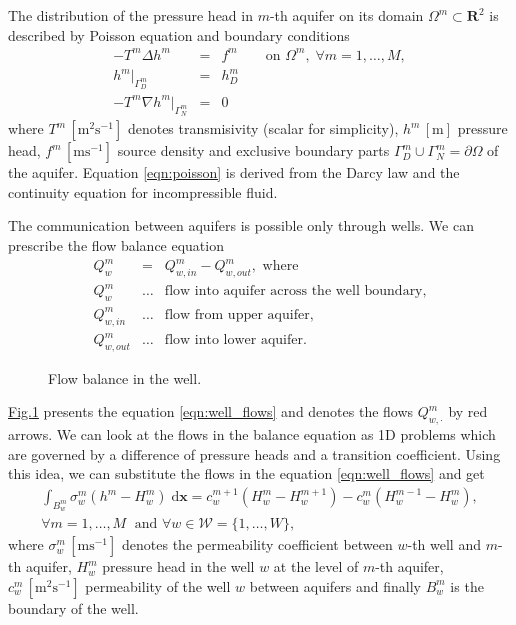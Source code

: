 \documentclass[preprint,12pt,authoryear]{elsarticle}
\newcommand{\fig}[1]{\hyperref[#1]{Fig.\ref{#1}}}
\newcommand{\figpath}{../graphics/}
\newcommand{\dd}{\; \mathrm{d}}
\newcommand{\R}{\mathbf{R}}
\newcommand{\bx}{\mathbf{x}}
\begin{document}
The distribution of the pressure head in $m$-th aquifer on its domain $\Omega^m\subset\R^2$ is described by 
Poisson equation and boundary conditions
\begin{eqnarray} \label{eqn:poisson}
-T^m\Delta{}h^m &=& f^m \qquad \textrm{on } \Omega^m,\; \forall m=1,\dots,M, \\
h^m|_{\Gamma^m_D} &=& h^m_D \\
-T^m\nabla h^m|_{\Gamma^m_N} &=& 0
\end{eqnarray}
where $T^m\, [\textrm{m}^2\textrm{s}^{-1}]$ denotes transmisivity (scalar for simplicity), 
$h^m\, [\textrm{m}]$ pressure head, $f^m\, [\textrm{m}\textrm{s}^{-1}]$ source density and exclusive 
boundary parts $\Gamma^m_D \cup \Gamma^m_N = \partial\Omega$ of the aquifer. 
Equation \eqref{eqn:poisson} is derived from the Darcy law and the continuity equation 
for incompressible fluid.

The communication between aquifers is possible only through wells. We can prescribe the flow balance equation 
\begin{eqnarray}
  Q^m_w &=& Q^m_{w,in} - Q^m_{w,out}, \textrm{ where} \label{eqn:well_flows} \\
  Q^m_w &\ldots& \textrm{flow into aquifer across the well boundary,} \nonumber\\
  Q^m_{w,in} &\ldots& \textrm{flow from upper aquifer,} \nonumber\\
  Q^m_{w,out} &\ldots& \textrm{flow into lower aquifer.} \nonumber
\end{eqnarray}
\begin{figure}[!htb]
  \begin{center}         
    \def\svgwidth{0.5\textwidth}
    
  \end{center}
  \caption{Flow balance in the well.}
  \label{fig:well_flows}
\end{figure}

\fig{fig:well_flows} presents the equation \eqref{eqn:well_flows} and denotes the flows $Q^m_{w,\cdot}$ by red arrows.
We can look at the flows in the balance equation as 1D problems which are governed by a difference of pressure
heads and a transition coefficient. Using this idea, we can substitute the flows in the equation 
\eqref{eqn:well_flows} and get
\begin{eqnarray} 
\int_{B_w^m}\sigma_w^m \left(h^m - H_w^m\right) \dd\bx 
  = c_w^{m+1}\left( H^m_w-H_w^{m+1}\right) - c^m_w\left( H^{m-1}_w-H^m_w \right), \label{eqn:well_balance} \\
 \forall m=1,\dots,M \;\textrm{ and } \forall w\in\mathcal{W}=\{1,\dots,W\}, \nonumber
\end{eqnarray}
where $\sigma^m_w\, [\textrm{m}\textrm{s}^{-1}]$ denotes the permeability coefficient between $w$-th well and $m$-th aquifer, 
$H_w^m$ pressure head in the well $w$ at the level of $m$-th aquifer, $c^m_w\, [\textrm{m}^2\textrm{s}^{-1}]$ 
permeability of the well $w$ between aquifers and finally $B^m_w$ is the boundary of the well.
\end{document}
